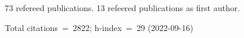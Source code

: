73 refereed publications. 13 refeered publications as first author.

Total citations~=~2822; h-index~=~29 (2022-09-16)